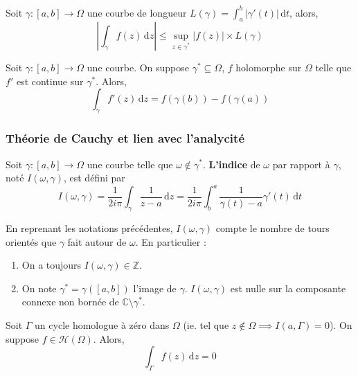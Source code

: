 	\begin{proposition}
		Soit $\gamma : [a,b] \rightarrow \Omega$ une courbe de longueur $L(\gamma) = \int_{a}^{b} \vert \gamma'(t) \vert \, \mathrm{d}t$, alors,
		\[ \left\vert \int_\gamma f(z) \, \mathrm{d}z \right\vert \leq \sup_{z \in \gamma^*} \vert f(z) \vert \times L(\gamma) \]
	\end{proposition}

	\begin{proposition}
		Soit $\gamma : [a,b] \rightarrow \Omega$ une courbe. On suppose $\gamma^* \subseteq \Omega$, $f$ holomorphe sur $\Omega$ telle que $f'$ est continue sur $\gamma^*$. Alors,
		\[ \int_\gamma f'(z) \, \mathrm{d}z = f(\gamma(b)) - f(\gamma(a)) \]
	\end{proposition}

	\subsubsection{Théorie de Cauchy et lien avec l'analycité}

	\begin{definition}
		Soit $\gamma : [a,b] \rightarrow \Omega$ une courbe telle que $\omega \notin \gamma^*$. \textbf{L'indice} de $\omega$ par rapport à $\gamma$, noté $I(\omega, \gamma)$, est défini par
		\[ I(\omega, \gamma) = \frac{1}{2i\pi} \int_\gamma \frac{1}{z-a} \, \mathrm{d}z = \frac{1}{2i\pi} \int_b^a \frac{1}{\gamma(t)-a} \gamma'(t) \, \mathrm{d}t \]
	\end{definition}

	\begin{remark}
		En reprenant les notations précédentes, $I(\omega, \gamma)$ compte le nombre de tours orientés que $\gamma$ fait autour de $\omega$. En particulier :
		\begin{enumerate}[label=(\roman*)]
			\item On a toujours $I(\omega, \gamma) \in \mathbb{Z}$.
			\item On note $\gamma^* = \gamma([a,b])$ l'image de $\gamma$. $I(\omega, \gamma)$ est nulle sur la composante connexe non bornée de $\mathbb{C} \setminus \gamma^*$.
		\end{enumerate}
	\end{remark}


	\begin{theorem}
		Soit $\Gamma$ un cycle homologue à zéro dans $\Omega$ (ie. tel que $z \notin \Omega \implies I(a, \Gamma) = 0$). On suppose $f \in \mathcal{H}(\Omega)$. Alors,
		\[ \int_\Gamma f(z) \, \mathrm{d}z = 0 \]
	\end{theorem}

